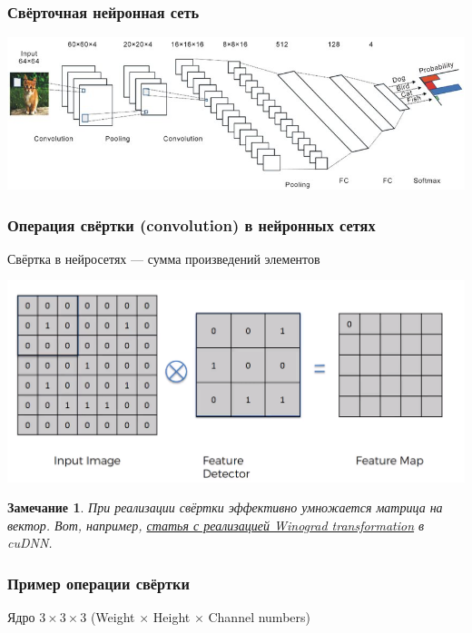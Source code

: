 \documentclass[fullscreen=true, bookmarks=true, hyperref={pdfencoding=unicode}]{beamer}
\newtheorem*{remark}{Замечание}
\begin{document}
\begin{frame}
  \frametitle{Свёрточная нейронная сеть}
  \begin{center}
    \includegraphics[keepaspectratio,
                     width=0.8\paperwidth]{cnn-example.png}
  \end{center}
\end{frame}

\begin{frame}
  \frametitle{Операция свёртки (convolution) в нейронных сетях}
  Свёртка в нейросетях — сумма произведений элементов
  \begin{center}
    \includegraphics[keepaspectratio,
                     width=0.8\paperwidth]{conv-example.png}
  \end{center}
\end{frame}

\begin{frame}
  \begin{remark}
  При реализации свёртки эффективно умножается матрица на вектор. Вот, например, \href{https://arxiv.org/pdf/1509.09308.pdf}{статья с реализацией Winograd transformation} в cuDNN.
  \end{remark}
\end{frame}

\begin{frame}
  \frametitle{Пример операции свёртки}
  Ядро $3\times3\times3$ (Weight $\times$ Height $\times$ Channel numbers)
  \begin{center}
  \end{center}
\end{frame}
\end{document}
